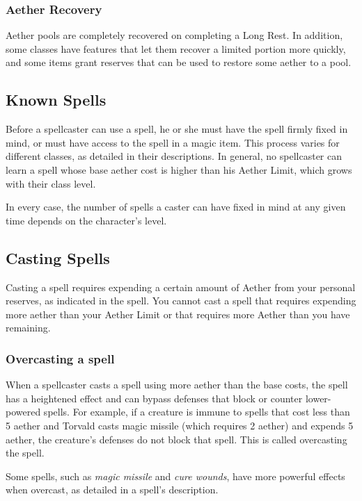 \subsubsection{Aether Recovery}
Aether pools are completely recovered on completing a Long Rest. In addition, some classes have features that let them recover a limited portion more quickly, and some items grant reserves that can be used to restore some aether to a pool.

\subsection{Known Spells}

Before a spellcaster can use a spell, he or she must have the spell firmly fixed in mind, or must have access to the spell in a magic item. This process varies for different classes, as detailed in their descriptions. In general, no spellcaster can learn a spell whose base aether cost is higher than his Aether Limit, which grows with their class level. 

In every case, the number of spells a caster can have fixed in mind at any given time depends on the character's level.

\subsection{Casting Spells}
Casting a spell requires expending a certain amount of Aether from your personal reserves, as indicated in the spell. You cannot cast a spell that requires expending more aether than your Aether Limit or that requires more Aether than you have remaining. 

\subsubsection{Overcasting a spell}

When a spellcaster casts a spell using more aether than the base costs, the spell has a heightened effect and can bypass defenses that block or counter lower-powered spells. For example, if a creature is immune to spells that cost less than 5 aether and Torvald casts magic missile (which requires 2 aether) and expends 5 aether, the creature's defenses do not block that spell. This is called overcasting the spell.

Some spells, such as \textit{magic missile} and \textit{cure wounds}, have more powerful effects when overcast, as detailed in a spell's description.

